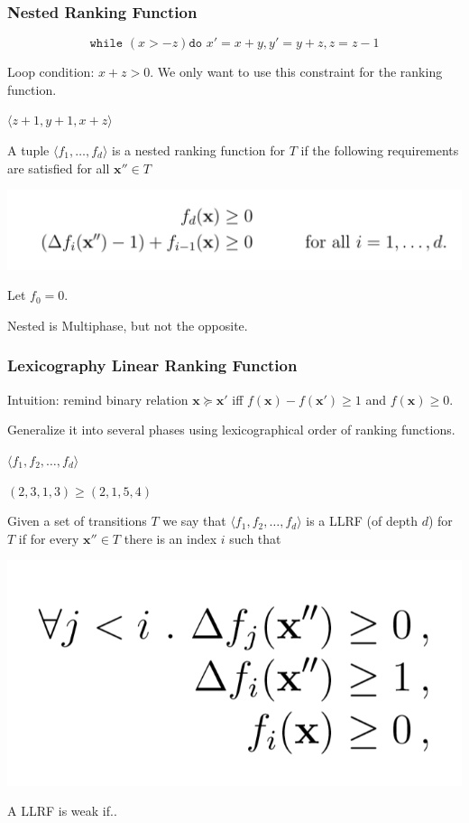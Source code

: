 \documentclass[11pt]{beamer}
\begin{document}
\begin{frame}\frametitle{Nested Ranking Function}
\[\texttt{while }( x > -z) \texttt{do } x' = x + y, y' = y + z, z = z - 1\]

Loop condition: $x + z > 0$. We only want to use this constraint for the ranking function.

$\langle z + 1, y + 1, x + z\rangle$


\begin{definition}

A tuple $\langle f_1, \ldots, f_d\rangle$ is a nested ranking function for $T$ if the following requirements are satisfied for all $\textbf{x}''\in T$
\begin{center}
\includegraphics[scale = 0.3]{6.png}

\end{center}

Let $f_0 = 0$.
\end{definition}

Nested is Multiphase, but not the opposite.
\end{frame}

\begin{frame}\frametitle{Lexicography Linear Ranking Function}

Intuition: remind binary relation $\textbf{x} \succeq \textbf{x}'$ iff  $f(\textbf{x}) - f(\textbf{x}') \ge 1$ and $f(\textbf{x}) \ge 0$.

Generalize it into several phases using lexicographical order of ranking functions.

$\langle f_1, f_2, \ldots, f_d\rangle$

$(2,3,1,3) \ge (2,1,5,4)$

\begin{definition}[LLRF]
Given a set of transitions $T$ we say that 
$\langle f_1, f_2, \ldots, f_d\rangle$ is a LLRF (of depth $d$) for $T$ if for every $\textbf{x}''\in T$ there is an index $i$ such that 
\begin{center}
\includegraphics[scale = 0.26]{4.png}

\end{center}
A LLRF is weak if..
\end{definition}
\end{frame}
\end{document}

